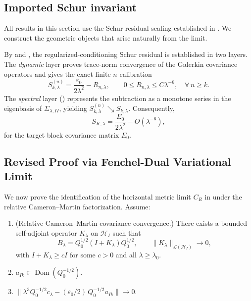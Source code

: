 \subsection{Imported Schur invariant}
\label{sec:appendix:schur}
\label{sec:formal:channel}

All results in this section use the Schur residual scaling established in . We construct the geometric objects that arise naturally from the limit.

\begin{lemma}
\label{lem:imported_schur}
By  and , the regularized-conditioning Schur residual is established in two layers. The \emph{dynamic} layer proves trace-norm convergence of the Galerkin covariance operators and gives the exact finite-$n$ calibration
\begin{equation}
  S_{k,\lambda}^{(n)} = \frac{\varepsilon_0}{2\lambda^2} - R_{n,\lambda},
  \qquad 0\le R_{n,\lambda}\le C\lambda^{-6},
  \quad\forall\,n\ge k.
\end{equation}
The \emph{spectral} layer () represents the subtraction as a monotone series in the eigenbasis of $\Sigma_{\lambda,II}$, yielding $S_{k,\lambda}^{(n)}\searrow S_{k,\lambda}$. Consequently,
\begin{equation}
  S_{K,\lambda} = \frac{E_0}{2\lambda^2} - O(\lambda^{-6}),
\end{equation}
for the target block covariance matrix $E_0$.
\end{lemma}

\subsection{Revised Proof via Fenchel-Dual Variational Limit}
\label{sec:appendix:bulk_rfim_proofs}
\label{sec:formal:bulk_rfim}

We now prove the identification of the horizontal metric limit $C_R$ in  under the relative Cameron--Martin factorization. Assume:
\begin{enumerate}
  \item[(i)] (Relative Cameron--Martin covariance convergence.) There exists a bounded self-adjoint operator $K_\lambda$ on $\mathcal{H}_I$ such that
  \[
    B_\lambda = Q_0^{1/2}(I + K_\lambda)Q_0^{1/2}, \qquad \|K_\lambda\|_{\mathcal{L}(\mathcal{H}_I)} \to 0,
  \]
  with $I + K_\lambda \ge cI$ for some $c > 0$ and all $\lambda \ge \lambda_0$.
  \item[(ii)] $a_{Ik}\in\operatorname{Dom}(Q_0^{-1/2})$.
  \item[(iii)] $\|\lambda^3 Q_0^{-1/2} c_\lambda - (\varepsilon_0/2)\,Q_0^{-1/2} a_{Ik}\| \to 0$.
\end{enumerate}

